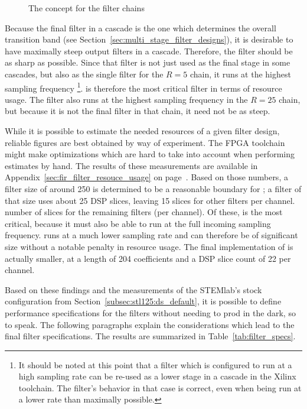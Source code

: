 \begin{figure}
    \centering
    
    \caption[Filter Chain Concept]{The concept for the filter chains}
    \label{fig:fdesign:chain_concept}
\end{figure}

Because the final filter in a cascade  is the one which determines the overall
transition  band  (see  Section~\ref{sec:multi_stage_filter_designs}),  it  is
desirable to have maximally steep  output filters in a cascade. Therefore, the
filter  should be as sharp  as possible. Since that filter is not
just used as the  final stage in some cascades, but also  as the single filter
for the $R=5$ chain, it runs  at the highest sampling frequency%
\footnote{%
    It should be noted at this point  that a filter which is configured to run
    at a high  sampling rate can be re-used  as a lower stage in  a cascade in
    the Xilinx toolchain. The filter's behavior  in that case is correct, even
    when being run at a lower rate than maximally possible.%
}.
  is therefore  the most  critical  filter in  terms of  resource
usage. The filter  also runs  at the highest sampling frequency in
the $R=25$  chain, but because it  is not the  final filter in that  chain, it
need not be as steep.

While  it is  possible to  estimate  the needed  resources of  a given  filter
design,  reliable  figures  are  best   obtained  by  way  of  experiment. The
FPGA  toolchain  might  make  optimizations   which  are  hard  to  take  into
account   when  performing   estimates  by   hand.   The   results  of   these
measurements are  available in  Appendix~\ref{sec:fir_filter_resouce_usage} on
page~\pageref{sec:fir_filter_resouce_usage}. Based on those  numbers, a filter
size  of around  \num{250}  is  determined to  be  a  reasonable boundary  for
; a filter  of that size uses about \num{25}  DSP slices, leaving
\num{15}  slices for  other  filters per  channel. number  of  slices for  the
remaining filters (per channel). Of these,   is the most critical,
because it must also  be able to run at the  full incoming sampling frequency.
  runs at  a much  lower sampling  rate and  can therefore  be of
significant  size without  a notable  penalty  in resource  usage.  The  final
implementation of  is actually  smaller, at a length of \num{204}
coefficients and a DSP slice count of \num{22} per channel.

Based  on  these  findings  and   the  measurements  of  the  STEMlab's  stock
configuration from  Section~\ref{subsec:stl125:ds_default}, it is  possible to
define performance specifications  for the filters without needing  to prod in
the dark,  so to  speak. The following  paragraphs explain  the considerations
which lead to  the final filter specifications. The results  are summarized in
Table~\ref{tab:filter_specs}.

